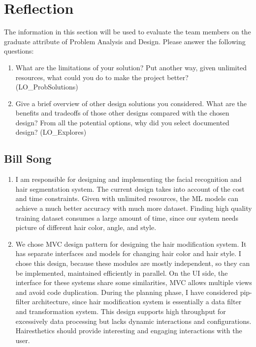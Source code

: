\documentclass[12pt, titlepage]{article}
\begin{document}
\section{Reflection}

The information in this section will be used to evaluate the team members on the
graduate attribute of Problem Analysis and Design.  Please answer the following questions:

\begin{enumerate}
  \item What are the limitations of your solution?  Put another way, given
  unlimited resources, what could you do to make the project better? (LO\_ProbSolutions)
  \item Give a brief overview of other design solutions you considered.  What
  are the benefits and tradeoffs of those other designs compared with the chosen
  design?  From all the potential options, why did you select documented design?
  (LO\_Explores)
\end{enumerate}

\subsection{Bill Song}
\begin{enumerate}
    \item I am responsible for designing and implementing the facial recognition and hair segmentation system. The current design takes into account of the cost and time constraints. Given with unlimited resources, the ML models can achieve a much better accuracy with much more dataset. Finding high quality training dataset consumes a large amount of time, since our system needs picture of different hair color, angle, and style.
    \item We chose MVC design pattern for designing the hair modification system. It has separate interfaces and models for changing hair color and hair style. I chose this design, because these modules are mostly independent, so they can be implemented, maintained efficiently in parallel. On the UI side, the interface for these systems share some similarities, MVC allows multiple views and avoid code duplication. During the planning phase, I have considered pip-filter architecture, since hair modification system is essentially a data filter and transformation system. This design supports high throughput for excessively data processing but lacks dynamic interactions and configurations. Hairesthetics should provide interesting and engaging interactions with the user.
\end{enumerate}
\end{document}
